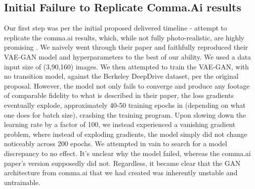 \documentclass{article}
\begin{document}
\subsection{Initial Failure to Replicate Comma.Ai results}
Our first step was per the initial proposed delivered timeline - attempt to replicate the comma.ai results, which, while not fully photo-realistic, are highly promising \cite{santana2016learning}. We naively went through their paper and faithfully reproduced their VAE-GAN model and hyperparameters to the best of our ability. We used a data input size of (3,90,160) images. We then attempted to train the VAE-GAN, with no transition model, against the Berkeley DeepDrive dataset, per the original proposal. However, the model not only fails to converge and produce any footage of comparable fidelity to what is described in their paper, the loss gradients eventually explode, approximately 40-50 training epochs in (depending on what one does for batch size), crashing the training program. Upon slowing down the learning rate by a factor of 100, we instead experienced a vanishing gradient problem, where instead of exploding gradients, the model simply did not change noticeably across 200 epochs. We attempted in vain to search for a model discrepancy to no effect. It's unclear why the model failed, whereas the comma.ai paper's version supposedly did not. Regardless, it became clear that the GAN architecture from comma.ai that we had created was inherently unstable and untrainable.
\end{document}

